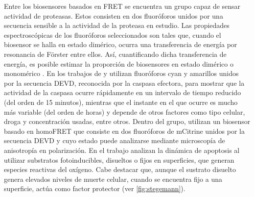 Entre los biosensores basados en FRET se encuentra un grupo capaz de sensar actividad de proteasas. Estos consisten en dos fluoróforos unidos por una secuencia sensible a la actividad de la proteasa en estudio. Las propiedades espectroscópicas de los fluoróforos seleccionados son tales que, cuando el biosensor se halla en estado dimérico, ocurra una transferencia de energía por resonancia de Förster entre ellos. Así, cuantificando dicha transferencia de energía, es posible estimar la proporción de biosensores en estado dimérico o monomérico \citep{Greenwald2018}. En los trabajos de \cite{Tyas2000} y \cite{Rehm2002} utilizan fluoróforos cyan y amarillos unidos por la secuencia DEVD, reconocida por la caspasa efectora, para mostrar que la actividad de la caspasa ocurre rápidamente en un intervalo de tiempo reducido (del orden de 15 minutos), mientras que el instante en el que ocurre es mucho más variable (del orden de horas) y depende de otros factores como tipo celular, droga y concentración usadas, entre otros. Dentro del grupo, \cite{Stegemann2015} utilizan un biosensor basado en homoFRET que consiste en dos fluoróforos de mCitrine unidos por la secuencia DEVD y cuyo estado puede analizarse mediante microscopía de anisotropía en polarización. En el trabajo analizan la dinámica de apoptosis al utilizar substratos fotoinducibles, disueltos o fijos en superficies, que generan especies reactivas del oxígeno. Cabe destacar que, aunque el sustrato disuelto genera elevados niveles de muerte celular, cuando se encuentra fijo a una superficie, actúa como factor protector (ver \cref{fig:stegemann}).

